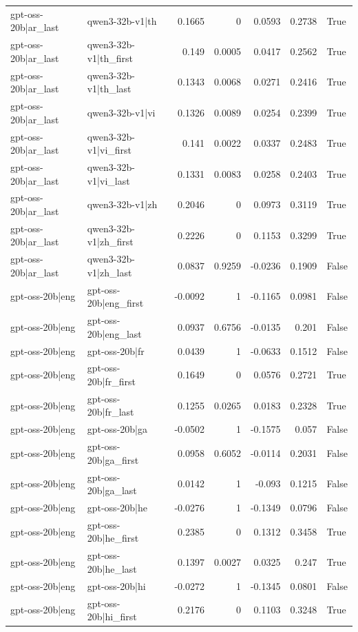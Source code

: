 \begin{table}
\begin{tabular}{l l r r r r l}
gpt-oss-20b|ar_last & qwen3-32b-v1|th & 0.1665 & 0 & 0.0593 & 0.2738 & True \\
gpt-oss-20b|ar_last & qwen3-32b-v1|th_first & 0.149 & 0.0005 & 0.0417 & 0.2562 & True \\
gpt-oss-20b|ar_last & qwen3-32b-v1|th_last & 0.1343 & 0.0068 & 0.0271 & 0.2416 & True \\
gpt-oss-20b|ar_last & qwen3-32b-v1|vi & 0.1326 & 0.0089 & 0.0254 & 0.2399 & True \\
gpt-oss-20b|ar_last & qwen3-32b-v1|vi_first & 0.141 & 0.0022 & 0.0337 & 0.2483 & True \\
gpt-oss-20b|ar_last & qwen3-32b-v1|vi_last & 0.1331 & 0.0083 & 0.0258 & 0.2403 & True \\
gpt-oss-20b|ar_last & qwen3-32b-v1|zh & 0.2046 & 0 & 0.0973 & 0.3119 & True \\
gpt-oss-20b|ar_last & qwen3-32b-v1|zh_first & 0.2226 & 0 & 0.1153 & 0.3299 & True \\
gpt-oss-20b|ar_last & qwen3-32b-v1|zh_last & 0.0837 & 0.9259 & -0.0236 & 0.1909 & False \\
gpt-oss-20b|eng & gpt-oss-20b|eng_first & -0.0092 & 1 & -0.1165 & 0.0981 & False \\
gpt-oss-20b|eng & gpt-oss-20b|eng_last & 0.0937 & 0.6756 & -0.0135 & 0.201 & False \\
gpt-oss-20b|eng & gpt-oss-20b|fr & 0.0439 & 1 & -0.0633 & 0.1512 & False \\
gpt-oss-20b|eng & gpt-oss-20b|fr_first & 0.1649 & 0 & 0.0576 & 0.2721 & True \\
gpt-oss-20b|eng & gpt-oss-20b|fr_last & 0.1255 & 0.0265 & 0.0183 & 0.2328 & True \\
gpt-oss-20b|eng & gpt-oss-20b|ga & -0.0502 & 1 & -0.1575 & 0.057 & False \\
gpt-oss-20b|eng & gpt-oss-20b|ga_first & 0.0958 & 0.6052 & -0.0114 & 0.2031 & False \\
gpt-oss-20b|eng & gpt-oss-20b|ga_last & 0.0142 & 1 & -0.093 & 0.1215 & False \\
gpt-oss-20b|eng & gpt-oss-20b|he & -0.0276 & 1 & -0.1349 & 0.0796 & False \\
gpt-oss-20b|eng & gpt-oss-20b|he_first & 0.2385 & 0 & 0.1312 & 0.3458 & True \\
gpt-oss-20b|eng & gpt-oss-20b|he_last & 0.1397 & 0.0027 & 0.0325 & 0.247 & True \\
gpt-oss-20b|eng & gpt-oss-20b|hi & -0.0272 & 1 & -0.1345 & 0.0801 & False \\
gpt-oss-20b|eng & gpt-oss-20b|hi_first & 0.2176 & 0 & 0.1103 & 0.3248 & True \\

\end{tabular}
\end{table}

